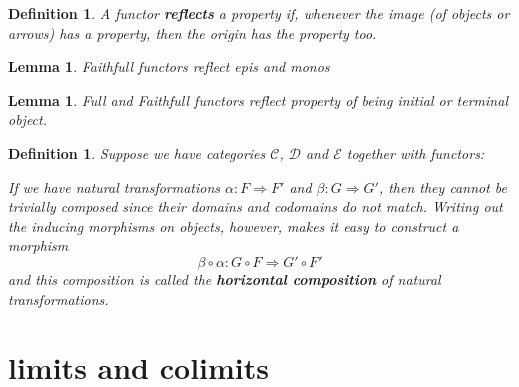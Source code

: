 \documentclass{article}
\newcommand{\cat}[1]{\mathcal{#1}} %
\newtheorem{lemma}[theorem]{Lemma}
\newtheorem{definition}[theorem]{Definition}
\begin{document}
\begin{definition}
	A functor \textbf{reflects} a property if, whenever the image (of objects or arrows) has a property, then the origin has the property too.
\end{definition}

\begin{lemma}
	Faithfull functors reflect epis and monos
\end{lemma}

\begin{lemma}
	Full and Faithfull functors reflect property of being initial or terminal object.
\end{lemma}

\begin{definition}
	Suppose we have categories $\cat{C}$, $\cat{D}$ and $\cat{E}$ together with functors:
	If we have natural transformations $\alpha: F \Rightarrow F'$ and $\beta: G \Rightarrow G'$, then they cannot be trivially composed since their domains and codomains do not match.
	Writing out the inducing morphisms on objects, however, makes it easy to construct a morphism
	$$\beta \circ \alpha: G \circ F \Rightarrow G' \circ F'$$
	and this composition is called the \textbf{horizontal composition} of natural transformations.
\end{definition}


\section{limits and colimits}
\end{document}
